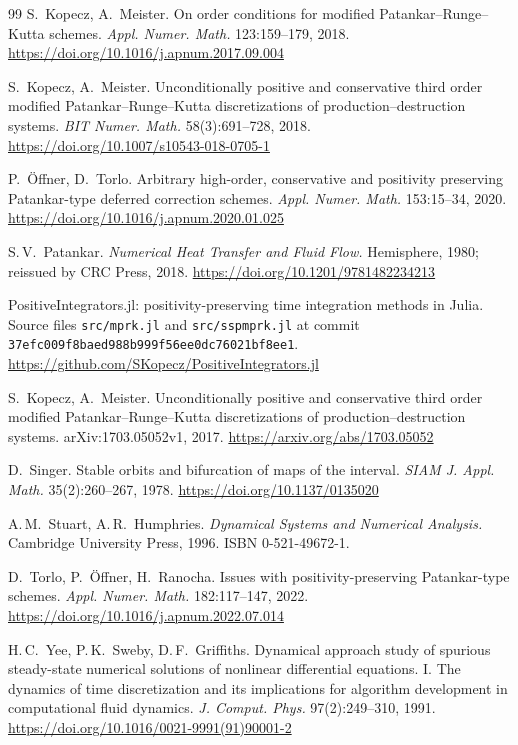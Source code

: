 \documentclass[11pt,a4paper]{article}
\theoremstyle{plain}
\theoremstyle{definition}
\begin{document}
\begin{thebibliography}{99}
S.~Kopecz, A.~Meister.
On order conditions for modified Patankar--Runge--Kutta schemes.
\emph{Appl. Numer. Math.} 123:159--179, 2018.
\url{https://doi.org/10.1016/j.apnum.2017.09.004}

S.~Kopecz, A.~Meister.
Unconditionally positive and conservative third order modified Patankar--Runge--Kutta discretizations of production--destruction systems.
\emph{BIT Numer. Math.} 58(3):691--728, 2018.
\url{https://doi.org/10.1007/s10543-018-0705-1}

P.~\"Offner, D.~Torlo.
Arbitrary high-order, conservative and positivity preserving Patankar-type deferred correction schemes.
\emph{Appl. Numer. Math.} 153:15--34, 2020.
\url{https://doi.org/10.1016/j.apnum.2020.01.025}

S.\,V.~Patankar.
\emph{Numerical Heat Transfer and Fluid Flow.}
Hemisphere, 1980; reissued by CRC Press, 2018.
\url{https://doi.org/10.1201/9781482234213}

PositiveIntegrators.jl: positivity-preserving time integration methods in Julia.
Source files \texttt{src/mprk.jl} and \texttt{src/sspmprk.jl} at commit \texttt{37efc009f8baed988b999f56ee0dc76021bf8ee1}.
\url{https://github.com/SKopecz/PositiveIntegrators.jl}

S.~Kopecz, A.~Meister.
Unconditionally positive and conservative third order modified Patankar--Runge--Kutta discretizations of production--destruction systems.
arXiv:1703.05052v1, 2017.
\url{https://arxiv.org/abs/1703.05052}

D.~Singer.
Stable orbits and bifurcation of maps of the interval.
\emph{SIAM J. Appl. Math.} 35(2):260--267, 1978.
\url{https://doi.org/10.1137/0135020}

A.\,M.~Stuart, A.\,R.~Humphries.
\emph{Dynamical Systems and Numerical Analysis.}
Cambridge University Press, 1996. ISBN 0-521-49672-1.

D.~Torlo, P.~\"Offner, H.~Ranocha.
Issues with positivity-preserving Patankar-type schemes.
\emph{Appl. Numer. Math.} 182:117--147, 2022.
\url{https://doi.org/10.1016/j.apnum.2022.07.014}

H.\,C.~Yee, P.\,K.~Sweby, D.\,F.~Griffiths.
Dynamical approach study of spurious steady-state numerical solutions of nonlinear differential equations. I. The dynamics of time discretization and its implications for algorithm development in computational fluid dynamics.
\emph{J. Comput. Phys.} 97(2):249--310, 1991.
\url{https://doi.org/10.1016/0021-9991(91)90001-2}

\end{thebibliography}
\endgroup
\end{document}
